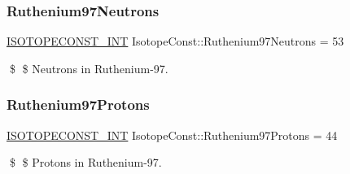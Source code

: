 \subsubsection{\texorpdfstring{Ruthenium97\+Neutrons}{Ruthenium97Neutrons}}
{\footnotesize\ttfamily \mbox{\hyperlink{group___isotope_const-_macros_ga5f18360b3e99483a35c32d789e62621c}{I\+S\+O\+T\+O\+P\+E\+C\+O\+N\+S\+T\+\_\+\+I\+NT}} Isotope\+Const\+::\+Ruthenium97\+Neutrons = 53}

\$ \$ Neutrons in Ruthenium-\/97. \mbox{\label{group___isotope_const-_ruthenium-_ru97_ga5a07b188bf93f142f274689b2d40ed14}} 
\subsubsection{\texorpdfstring{Ruthenium97\+Protons}{Ruthenium97Protons}}
{\footnotesize\ttfamily \mbox{\hyperlink{group___isotope_const-_macros_ga5f18360b3e99483a35c32d789e62621c}{I\+S\+O\+T\+O\+P\+E\+C\+O\+N\+S\+T\+\_\+\+I\+NT}} Isotope\+Const\+::\+Ruthenium97\+Protons = 44}

\$ \$ Protons in Ruthenium-\/97. 